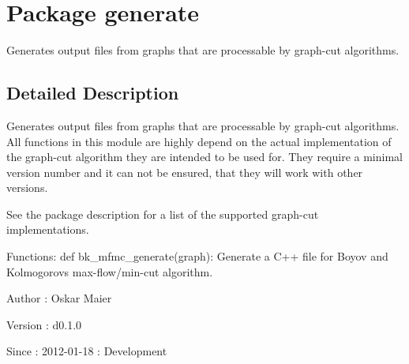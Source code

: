 \hypertarget{namespacegenerate}{
\section{Package generate}
\label{namespacegenerate}
}


Generates output files from graphs that are processable by graph-\/cut algorithms.  




\subsection{Detailed Description}
Generates output files from graphs that are processable by graph-\/cut algorithms. All functions in this module are highly depend on the actual implementation of the graph-\/cut algorithm they are intended to be used for. They require a minimal version number and it can not be ensured, that they will work with other versions.

See the package description for a list of the supported graph-\/cut implementations.

Functions: def bk\_\-mfmc\_\-generate(graph): Generate a C++ file for Boyov and Kolmogorovs max-\/flow/min-\/cut algorithm.

\begin{DoxyAuthor}{Author}
: Oskar Maier 
\end{DoxyAuthor}
\begin{DoxyVersion}{Version}
: d0.1.0 
\end{DoxyVersion}
\begin{DoxySince}{Since}
: 2012-\/01-\/18 : Development 
\end{DoxySince}
